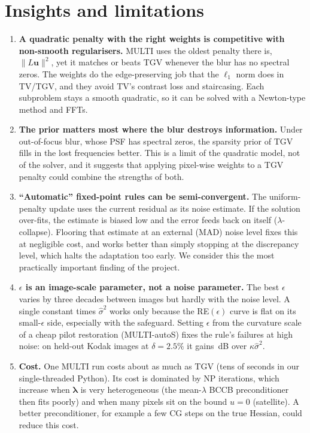 \section{Insights and limitations}
\label{sec:insights}

\begin{enumerate}[leftmargin=*,itemsep=2pt]
\item \textbf{A quadratic penalty with the right weights is competitive with
  non-smooth regularisers.} MULTI uses the oldest penalty there is,
  $\|L\mathbf u\|^2$, yet it matches or beats TGV whenever the blur has no spectral
  zeros. The weights do the edge-preserving job that the $\ell_1$ norm does in TV/TGV,
  and they avoid TV's contrast loss and staircasing. Each subproblem stays a smooth
  quadratic, so it can be solved with a Newton-type method and FFTs.

\item \textbf{The prior matters most where the blur destroys information.} Under
  out-of-focus blur, whose PSF has spectral zeros, the sparsity prior of TGV fills in
  the lost frequencies better. This is a limit of the quadratic model, not of the
  solver, and it suggests that applying pixel-wise weights to a TGV penalty could
  combine the strengths of both.

\item \textbf{``Automatic'' fixed-point rules can be semi-convergent.} The
  uniform-penalty update uses the current residual as its noise estimate. If the
  solution over-fits, the estimate is biased low and the error feeds back on itself
  ($\lambda$-collapse). Flooring that estimate at an external (MAD) noise level fixes
  this at negligible cost, and works better than simply stopping at the discrepancy level,
  which halts the adaptation too early. We consider this the most practically
  important finding of the project.

\item \textbf{$\epsilon$ is an image-scale parameter, not a noise parameter.}
  The best $\epsilon$ varies by three decades between images but hardly with the
  noise level. A single constant times $\hat\sigma^2$ works only because the
  RE$(\epsilon)$ curve is flat on its small-$\epsilon$ side, especially with the
  safeguard. Setting $\epsilon$ from the curvature scale of a cheap pilot restoration
  (MULTI-autoS) fixes the rule's failures at high noise: on held-out Kodak images at
  $\delta=2.5\%$ it gains \nKRHiGain\,dB over $\kappa\hat\sigma^2$.

\item \textbf{Cost.} One MULTI run costs about as much as TGV (tens of seconds in our
  single-threaded Python). Its cost is dominated by NP iterations, which increase when
  $\boldsymbol\lambda$ is very heterogeneous (the mean-$\lambda$ BCCB preconditioner then
  fits poorly) and when many pixels sit on the bound $u=0$ (satellite).
  A better preconditioner, for example a few CG steps on the true Hessian, could
  reduce this cost.
\end{enumerate}

